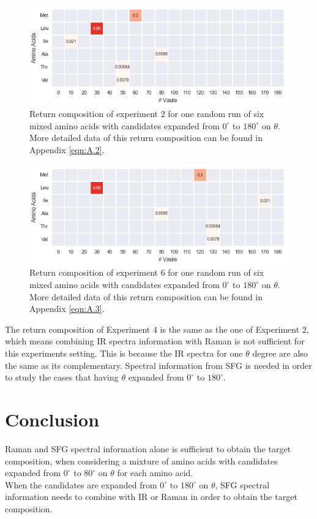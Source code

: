\begin{figure}[!ht] 
\centering
\includegraphics[scale=0.9]{Figures/mixture_return_composition_of_E1_for_one_run_theta_0_180.png}
\caption{Return composition of experiment 2 for one random run of six mixed amino acids with candidates expanded from $0^{\circ}$ to $180^{\circ}$ on $\theta$. More detailed data of this return composition can be found in Appendix \ref{eqn:A.2}.} 
\label{fig:5.5}
\end{figure}

\begin{figure}[!ht] 
\centering
\includegraphics[scale=0.9]{Figures/mixture_return_composition_of_E6_for_one_run_theta_0_180.png}
\caption{Return composition of experiment 6 for one random run of six mixed amino acids with candidates expanded from $0^{\circ}$ to $180^{\circ}$ on $\theta$. More detailed data of this return composition can be found in Appendix \ref{eqn:A.3}.} 
\label{fig:5.6}
\end{figure}

The return composition of Experiment 4 is the same as the one of Experiment 2, which means combining IR spectra information with Raman is not sufficient for this experiments setting. This is because the IR spectra for one $\theta$ degree are also the same as its complementary. Spectral information from SFG is needed in order to study the cases that having $\theta$ expanded from $0^{\circ}$ to $180^{\circ}$. \\


\section{Conclusion}
Raman and SFG spectral information alone is sufficient to obtain the target composition, when considering a mixture of amino acids with candidates expanded from $0^{\circ}$ to $80^{\circ}$ on $\theta$ for each amino acid. \\

When the candidates are expanded from $0^{\circ}$ to $180^{\circ}$ on $\theta$, SFG spectral information needs to combine with IR or Raman in order to obtain the target composition. \\
